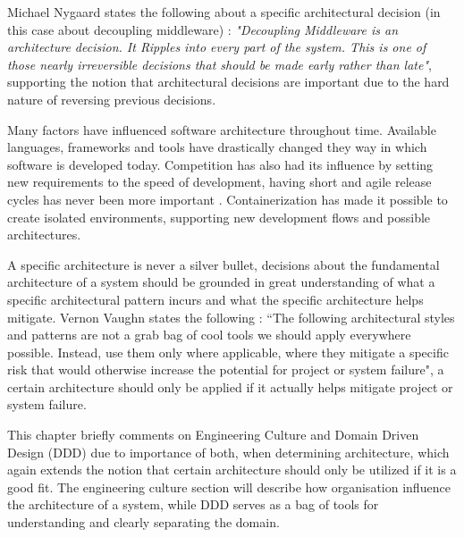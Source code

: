 Michael Nygaard states the following about a specific architectural decision (in this case about decoupling middleware) \cite[p.~116]{nygard2007release}: \textit{"Decoupling Middleware is an architecture decision. It Ripples into every part of the system. This is one of those nearly irreversible decisions that should be made early rather than late"}, supporting the notion that architectural decisions are important due to the hard nature of reversing previous decisions.

Many factors have influenced software architecture throughout time. Available languages, frameworks and tools have drastically changed they way in which software is developed today. Competition has also had its influence by setting new requirements to the speed of development, having short and agile release cycles has never been more important \cite[t.~06:55]{george2016it}. Containerization has made it possible to create isolated environments, supporting new development flows and possible architectures.

A specific architecture is never a silver bullet, decisions about the fundamental architecture of a system should be grounded in great understanding of what a specific architectural pattern incurs and what the specific architecture helps mitigate. Vernon Vaughn states the following \cite[p.~113]{vernon2013implementing}: “The following architectural styles and patterns are not a grab bag of cool tools we should apply everywhere possible. Instead, use them only where applicable, where they mitigate a specific risk that would otherwise increase the potential for project or system failure", a certain architecture should only be applied if it actually helps mitigate project or system failure.

This chapter briefly comments on Engineering Culture and Domain Driven Design (DDD) due to importance of both, when determining architecture, which again extends the notion that certain architecture should only be utilized if it is a good fit. The engineering culture section will describe how organisation influence the architecture of a system, while DDD serves as a bag of tools for understanding and clearly separating the domain.

